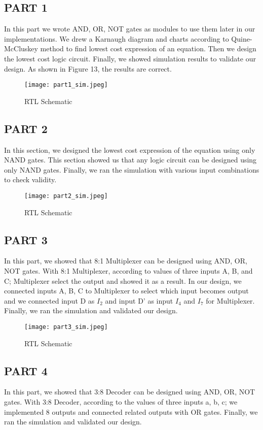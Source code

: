 \documentclass[pdftex,12pt,a4paper]{article}
\begin{document}
\subsection{PART 1}
In this part we wrote AND, OR, NOT gates as modules to use them later in our implementations. We drew a Karnaugh diagram and charts according to Quine-McCluskey method to find lowest cost expression of an equation. Then we design the lowest cost logic circuit. Finally, we showed simulation results to validate our design. As shown in Figure 13, the results are correct.
\begin{figure}[ht]
	\centering
	\texttt{[image: part1\_sim.jpeg]}	
	\caption{RTL Schematic}
	\label{fig12}
\end{figure}
\clearpage
\subsection{PART 2}
In this section, we designed the lowest cost expression of the equation using only NAND gates. This section showed us that any logic circuit can be designed using only NAND gates. Finally, we ran the simulation with various input combinations to check validity.

\begin{figure}[ht]
	\centering
	\texttt{[image: part2\_sim.jpeg]}	
	\caption{RTL Schematic}
	\label{fig13}
\end{figure}
\clearpage
\subsection{PART 3}
In this part, we showed that 8:1 Multiplexer can be designed using AND, OR, NOT gates.  With 8:1 Multiplexer, according to values of three inputs A, B, and C; Multiplexer select the output and showed it as a result. In our design, we connected inputs A, B, C to Multiplexer to select which input becomes output and we connected input D as \(I_2\) and input D' as input  \(I_4\) and  \(I_7\) for Multiplexer. Finally, we ran the simulation and validated our design. 
\begin{figure}[ht]
	\centering
	\texttt{[image: part3\_sim.jpeg]}	
	\caption{RTL Schematic}
	\label{fig14}
\end{figure}
\clearpage
\subsection{PART 4}
In this part, we showed that 3:8 Decoder can be designed using AND, OR, NOT gates. With 3:8 Decoder, according to the values of three inputs a, b, c; we implemented 8 outputs and connected related outputs with OR gates. Finally, we ran the simulation and validated our design. 
\end{document}
